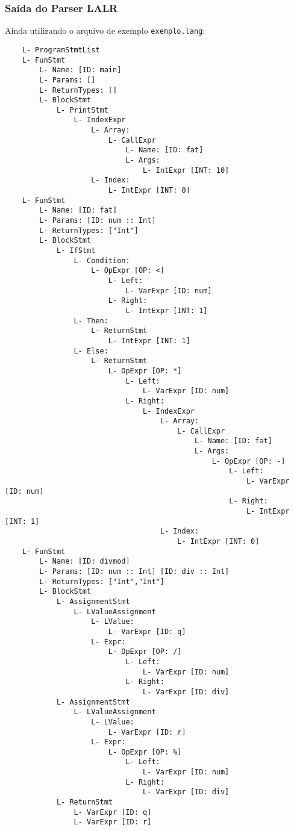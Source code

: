 \documentclass{article}
\begin{document}
\subsubsection{Saída do Parser LALR}
Ainda utilizando o arquivo de exemplo \texttt{exemplo.lang}:

\begin{verbatim}
    L- ProgramStmtList
    L- FunStmt
        L- Name: [ID: main]
        L- Params: []
        L- ReturnTypes: []
        L- BlockStmt
            L- PrintStmt
                L- IndexExpr
                    L- Array:
                        L- CallExpr
                            L- Name: [ID: fat]
                            L- Args:
                                L- IntExpr [INT: 10]
                    L- Index:
                        L- IntExpr [INT: 0]
    L- FunStmt
        L- Name: [ID: fat]
        L- Params: [ID: num :: Int] 
        L- ReturnTypes: ["Int"]
        L- BlockStmt
            L- IfStmt
                L- Condition:
                    L- OpExpr [OP: <]
                        L- Left:
                            L- VarExpr [ID: num]
                        L- Right:
                            L- IntExpr [INT: 1]
                L- Then:
                    L- ReturnStmt
                        L- IntExpr [INT: 1]
                L- Else:
                    L- ReturnStmt
                        L- OpExpr [OP: *]
                            L- Left:
                                L- VarExpr [ID: num]
                            L- Right:
                                L- IndexExpr
                                    L- Array:
                                        L- CallExpr
                                            L- Name: [ID: fat]
                                            L- Args:
                                                L- OpExpr [OP: -]
                                                    L- Left:
                                                        L- VarExpr [ID: num]
                                                    L- Right:
                                                        L- IntExpr [INT: 1]
                                    L- Index:
                                        L- IntExpr [INT: 0]
    L- FunStmt
        L- Name: [ID: divmod]
        L- Params: [ID: num :: Int] [ID: div :: Int] 
        L- ReturnTypes: ["Int","Int"]
        L- BlockStmt
            L- AssignmentStmt
                L- LValueAssignment
                    L- LValue:
                        L- VarExpr [ID: q]
                    L- Expr:
                        L- OpExpr [OP: /]
                            L- Left:
                                L- VarExpr [ID: num]
                            L- Right:
                                L- VarExpr [ID: div]
            L- AssignmentStmt
                L- LValueAssignment
                    L- LValue:
                        L- VarExpr [ID: r]
                    L- Expr:
                        L- OpExpr [OP: %]
                            L- Left:
                                L- VarExpr [ID: num]
                            L- Right:
                                L- VarExpr [ID: div]
            L- ReturnStmt
                L- VarExpr [ID: q]
                L- VarExpr [ID: r]
\end{verbatim}
\end{document}
